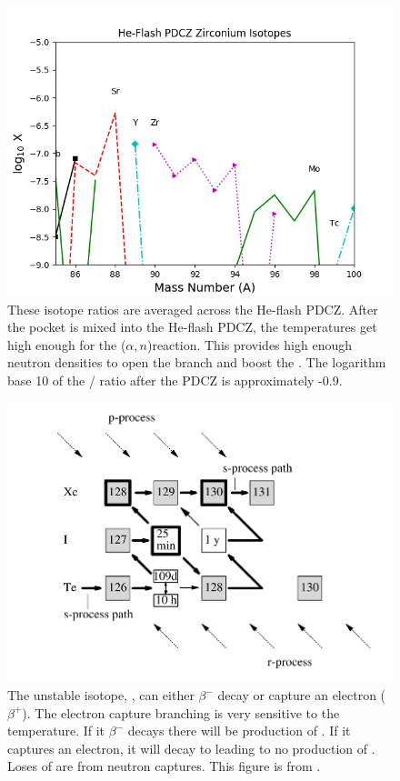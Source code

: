\documentclass[fleqn,usenatbib]{mnras}
\begin{document}
\begin{figure}
  \includegraphics[width=\columnwidth]{figs/Pulse_Zr.png}
  \caption{These isotope ratios are averaged across the He-flash PDCZ. After the \carbon[13] pocket is mixed into the He-flash PDCZ, the temperatures get high enough for the \neon[22]($\alpha,n$)\magnesium[25] reaction. This provides high enough neutron densities to open the \zirconium[95] branch and boost the \zirconium[96]. The logarithm base 10 of the \zirconium[96] / \zirconium[94] ratio after the PDCZ is approximately -0.9.} 
\end{figure}

\begin{figure}
	\includegraphics[width=\columnwidth]{figs/xe.png}
    \caption{The unstable isotope, \iodine[128], can either $\beta^{-}$ decay or capture an electron ($\beta^{+}$). The electron capture branching is very sensitive to the temperature. If it $\beta^{-}$ decays there will be production of \xenon[128]. If it captures an electron, it will decay to \tellurium[128] leading to no production of \xenon[128]. Loses of \xenon[128] are from neutron captures. This figure is from \citep{reif}.}
\end{figure}
\end{document}
